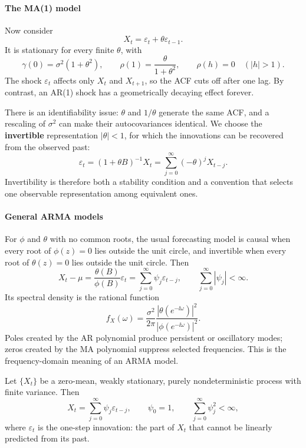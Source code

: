 \paragraph{The MA(1) model}
\hspace{0.55em}Now consider
\[
    X_t=\varepsilon_t+\theta\varepsilon_{t-1}.
\]
It is stationary for every finite $\theta$, with
\[
    \gamma(0)=\sigma^2(1+\theta^2),\qquad
    \rho(1)=\frac{\theta}{1+\theta^2},\qquad
    \rho(h)=0\quad(|h|>1).
\]
The shock $\varepsilon_t$ affects only $X_t$ and $X_{t+1}$, so the ACF cuts off
after one lag. By contrast, an AR(1) shock has a geometrically decaying effect
forever.

There is an identifiability issue: $\theta$ and $1/\theta$ generate the same ACF,
and a rescaling of $\sigma^2$ can make their autocovariances identical. We choose
the \textbf{invertible} representation $|\theta|<1$, for which the innovations can
be recovered from the observed past:
\[
    \varepsilon_t=(1+\theta B)^{-1}X_t
    =\sum_{j=0}^{\infty}(-\theta)^jX_{t-j}.
\]
Invertibility is therefore both a stability condition and a convention that
selects one observable representation among equivalent ones.

\paragraph{General ARMA models}
\hspace{0.55em}For $\phi$ and $\theta$ with no common roots, the usual forecasting model is
causal when every root of $\phi(z)=0$ lies outside the unit circle, and invertible
when every root of $\theta(z)=0$ lies outside the unit circle. Then
\[
    X_t-\mu=\frac{\theta(B)}{\phi(B)}\varepsilon_t
           =\sum_{j=0}^{\infty}\psi_j\varepsilon_{t-j},
    \qquad \sum_{j=0}^{\infty}|\psi_j|<\infty.
\]
Its spectral density is the rational function
\[
    f_X(\omega)
    =\frac{\sigma^2}{2\pi}
      \frac{|\theta(e^{-\ii\omega})|^2}{|\phi(e^{-\ii\omega})|^2}.
\]
Poles created by the AR polynomial produce persistent or oscillatory modes;
zeros created by the MA polynomial suppress selected frequencies. This is the
frequency-domain meaning of an ARMA model.

\begin{thm}
Let $\{X_t\}$ be a zero-mean, weakly stationary, purely nondeterministic process
with finite variance. Then
\[
    X_t=\sum_{j=0}^{\infty}\psi_j\varepsilon_{t-j},
    \qquad \psi_0=1,\qquad \sum_{j=0}^{\infty}\psi_j^2<\infty,
\]
where $\varepsilon_t$ is the one-step innovation: the part of $X_t$ that cannot
be linearly predicted from its past.
\end{thm}

